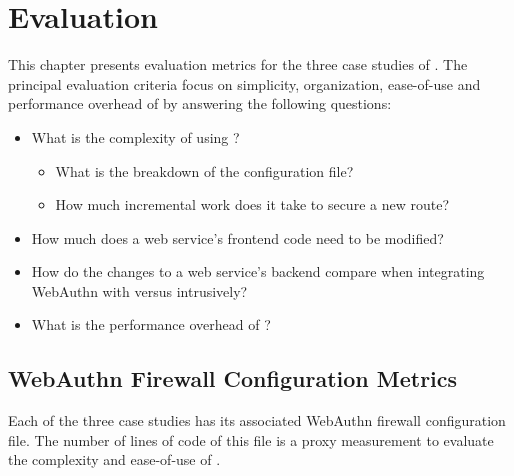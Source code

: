 
\chapter{Evaluation}\label{Chap:Evaluation}


This chapter presents evaluation metrics for the three case studies of \sys{}. The principal evaluation criteria focus on simplicity, organization, ease-of-use and performance overhead of \sys{} by answering the following questions:

\begin{itemize}[nosep]
\item What is the complexity of using \sys{}?

  \begin{itemize}[nosep]
    \item What is the breakdown of the configuration file?
    \item How much incremental work does it take to secure a new route?
  \end{itemize}

\item How much does a web service's frontend code need to be modified?

\item How do the changes to a web service's backend compare when integrating WebAuthn with \sys{} versus intrusively?

\item What is the performance overhead of \sys{}?

\end{itemize}



\section{WebAuthn Firewall Configuration Metrics}

Each of the three case studies has its associated WebAuthn firewall configuration file. The number of lines of code of this file is a proxy measurement to evaluate the complexity and ease-of-use of \sys{}. 

